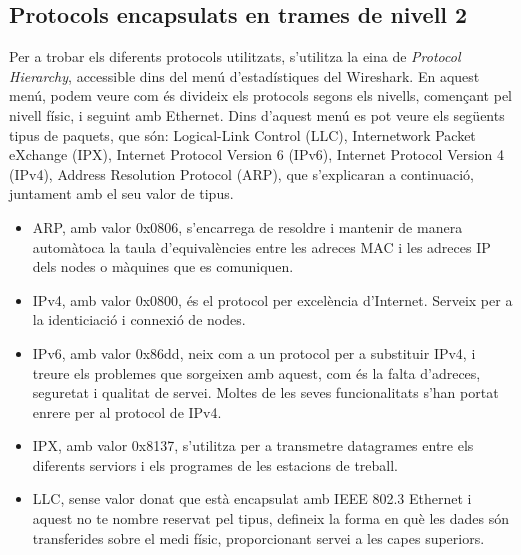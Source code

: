 \documentclass{article}
\begin{document}
\subsection{Protocols encapsulats en trames de nivell 2}
Per a trobar els diferents protocols utilitzats, s'utilitza la eina de
\textit{Protocol Hierarchy}, accessible dins del menú d'estadístiques del
Wireshark. En aquest menú, podem veure com és divideix els protocols segons els
nivells, començant pel nivell físic, i seguint amb Ethernet. Dins d'aquest menú
es pot veure els següents tipus de paquets, que són: Logical-Link Control (LLC),
Internetwork Packet eXchange (IPX), Internet Protocol Version 6 (IPv6),
Internet Protocol Version 4 (IPv4), Address Resolution Protocol (ARP), que
s'explicaran a continuació, juntament amb el seu valor de tipus.\\
\begin{itemize}
\item ARP, amb valor 0x0806, s'encarrega de resoldre i mantenir de manera automàtoca
la taula d'equivalències entre les adreces MAC i les adreces IP dels nodes o màquines
que es comuniquen.
\item IPv4, amb valor 0x0800, és el protocol per excelència d'Internet. Serveix
per a la identiciació i connexió de nodes.
\item IPv6, amb valor 0x86dd, neix com a un protocol per a substituir IPv4, i
treure els problemes que sorgeixen amb aquest, com és la falta d'adreces, seguretat i
qualitat de servei. Moltes de les seves funcionalitats s'han portat enrere per al
protocol de IPv4.
\item IPX, amb valor 0x8137, s'utilitza per a transmetre datagrames entre els
diferents serviors i els programes de les estacions de treball.
\item LLC, sense valor donat que està encapsulat amb IEEE 802.3 Ethernet i aquest
no te nombre reservat pel tipus, defineix la forma en què les dades són transferides
sobre el medi físic, proporcionant servei a les capes superiors.
\end{itemize}
\end{document}
